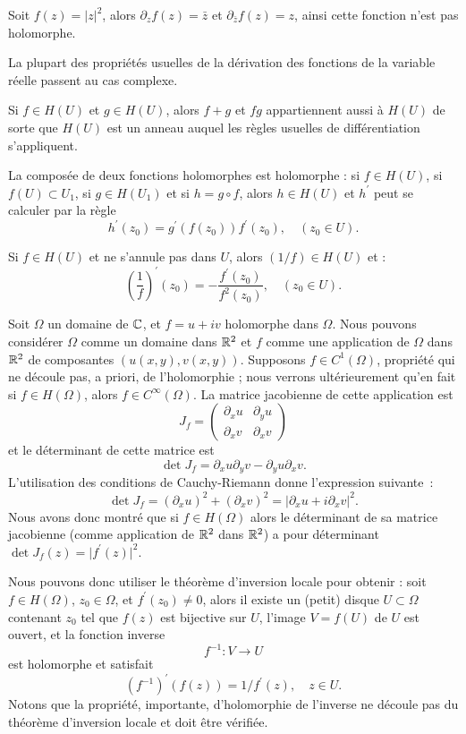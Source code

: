 \begin{exem} Soit $f(z)=\lvert z\rvert^2$, alors $\partial_z f(z)=\bar{z}$ et $ \partial_{\bar{z}} f(z)=z$, ainsi cette fonction n'est pas holomorphe. 

\end{exem}

La plupart des propriétés usuelles de la dérivation des fonctions de la variable réelle passent au cas complexe. 
\begin{fprop} 
Si $f \in H(U)$ et $g \in H(U)$, alors $f+g$ et $fg$ appartiennent aussi à $H(U)$ de sorte que $H(U)$ est un anneau auquel les règles usuelles de différentiation s'appliquent. 

La composée de deux fonctions holomorphes est holomorphe : si $f \in H(U)$, si $f(U) \subset U_1$, si $g \in H(U_1)$ et si $h=g \circ f$, alors $h \in H(U)$ et $h^\prime$ peut se calculer par la règle
\[h^\prime(z_0) =  g^\prime (f(z_0)) f^\prime (z_0), \quad (z_0 \in U).\]
  
Si $f \in H(U)$ et ne s'annule pas dans $U$, alors $(1/f) \in H(U)$ et : 
\[\left(\frac{1}{f}\right)^\prime (z_0)  = - \frac{f^\prime(z_0)}{f^2(z_0)}, \quad (z_0 \in U).\]
\end{fprop}

\begin{rem}
Soit $\Omega$ un domaine de $\mathbb{C}$, et $f =u +i v$ holomorphe dans $\Omega$. Nous pouvons considérer $\Omega$ comme un domaine dans $\mathbb R^2$ et $f$ comme une application de $\Omega$ dans $\mathbb R^2$ de composantes $(u(x,y), v(x,y))$. Supposons $f  \in C^1(\Omega)$,  propriété qui ne découle pas, a priori, de l'holomorphie ; nous verrons ultérieurement qu'en fait si $f \in H(\Omega)$, alors $f \in C^\infty(\Omega)$. La matrice jacobienne de cette application est 
\[J_f=\begin{pmatrix}
\partial_x u & \partial_y u\\
\partial_x v &\partial_x v 
\end{pmatrix}\]
et le déterminant de cette matrice est
\[\det J_f=\partial_x u \partial_y v - \partial_y u \partial_x v.\]
L'utilisation des conditions de Cauchy-Riemann donne l'expression suivante~:
  \[\det J_f=(\partial_x u)^2 + (\partial_x v)^2=\lvert \partial_x u + i \partial_x v \rvert ^2.\]
Nous avons donc montré que si $f \in H(\Omega)$ alors le déterminant de sa matrice jacobienne (comme application de $\mathbb R^2$ dans $\mathbb R^2$) a pour déterminant $\det J_f(z)=\lvert f^\prime(z)\rvert^2$.

Nous pouvons donc utiliser le théorème d'inversion locale  pour obtenir :  soit $f \in H(\Omega)$, $z_0 \in \Omega$, et $f^\prime(z_0) \neq 0$, alors il existe un (petit) disque $U \subset \Omega$ contenant $z_0$ tel que $f(z)$ est bijective sur $U$, l'image $V=f(U)$ de $U$ est ouvert, et la fonction inverse 
\[ f^{-1} \colon V \to U\]
est holomorphe et satisfait
\[(f^{-1})^\prime (f(z))=1/f^\prime(z), \quad z \in U.\]
Notons que la propriété, importante, d'holomorphie de l'inverse ne découle pas du théorème d'inversion locale et doit être vérifiée.  
\end{rem}


